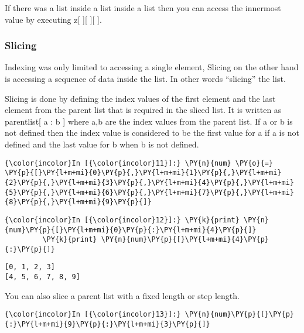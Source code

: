     If there was a list inside a list inside a list then you can access the
innermost value by executing z{[} {]}{[} {]}{[} {]}.

    \subsubsection{Slicing}\label{slicing}

    Indexing was only limited to accessing a single element, Slicing on the
other hand is accessing a sequence of data inside the list. In other
words ``slicing'' the list.

Slicing is done by defining the index values of the first element and
the last element from the parent list that is required in the sliced
list. It is written as parentlist{[} a : b {]} where a,b are the index
values from the parent list. If a or b is not defined then the index
value is considered to be the first value for a if a is not defined and
the last value for b when b is not defined.

    \begin{Verbatim}[commandchars=\\\{\}]
{\color{incolor}In [{\color{incolor}11}]:} \PY{n}{num} \PY{o}{=} \PY{p}{[}\PY{l+m+mi}{0}\PY{p}{,}\PY{l+m+mi}{1}\PY{p}{,}\PY{l+m+mi}{2}\PY{p}{,}\PY{l+m+mi}{3}\PY{p}{,}\PY{l+m+mi}{4}\PY{p}{,}\PY{l+m+mi}{5}\PY{p}{,}\PY{l+m+mi}{6}\PY{p}{,}\PY{l+m+mi}{7}\PY{p}{,}\PY{l+m+mi}{8}\PY{p}{,}\PY{l+m+mi}{9}\PY{p}{]}
\end{Verbatim}

    \begin{Verbatim}[commandchars=\\\{\}]
{\color{incolor}In [{\color{incolor}12}]:} \PY{k}{print} \PY{n}{num}\PY{p}{[}\PY{l+m+mi}{0}\PY{p}{:}\PY{l+m+mi}{4}\PY{p}{]}
         \PY{k}{print} \PY{n}{num}\PY{p}{[}\PY{l+m+mi}{4}\PY{p}{:}\PY{p}{]}
\end{Verbatim}

    \begin{Verbatim}[commandchars=\\\{\}]
[0, 1, 2, 3]
[4, 5, 6, 7, 8, 9]
    \end{Verbatim}

    You can also slice a parent list with a fixed length or step length.

    \begin{Verbatim}[commandchars=\\\{\}]
{\color{incolor}In [{\color{incolor}13}]:} \PY{n}{num}\PY{p}{[}\PY{p}{:}\PY{l+m+mi}{9}\PY{p}{:}\PY{l+m+mi}{3}\PY{p}{]}
\end{Verbatim}

